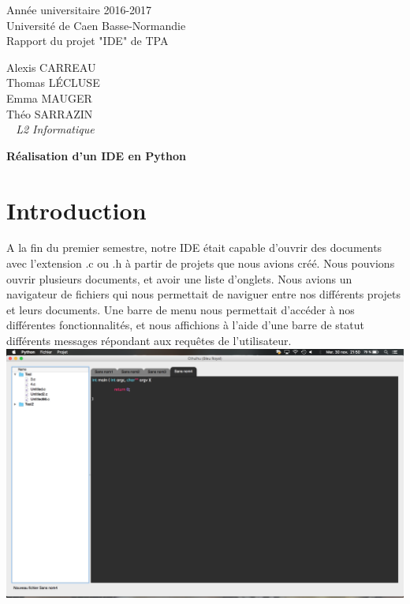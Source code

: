 \documentclass[a4paper,12pt]{article}
\begin{document}
\begin{titlepage}
	\begin{center}
		\Large{Année universitaire 2016-2017}\\
		\Large{Université de Caen Basse-Normandie}\\[1cm]
		
		\huge{Rapport du projet "IDE" de TPA}\\
		\vspace{3cm}
		
		Alexis CARREAU\\
		Thomas LÉCLUSE\\
		Emma MAUGER\\
		Théo SARRAZIN\\
		
		\normalsize{\textit{ ~ L2 Informatique}}\\
		\medskip
		\vspace{2cm}
		
		\huge{\textbf{Réalisation d'un IDE en Python}}
		
	\end{center}
\end{titlepage}

\tableofcontents
\newpage

\section{Introduction}

	A la fin du premier semestre, notre IDE était capable d'ouvrir des documents avec l'extension .c ou .h à partir de projets que nous avions créé. Nous pouvions ouvrir plusieurs documents, et avoir une liste d'onglets. Nous avions un navigateur de fichiers qui nous permettait de naviguer entre nos différents projets et leurs documents. Une barre de menu nous permettait d'accéder à nos différentes fonctionnalités, et nous affichions à l'aide d'une barre de statut différents messages répondant aux requêtes de l'utilisateur.\\
	
	\includegraphics[scale=0.3]{images/ide_v1.png}
	
\end{document}
